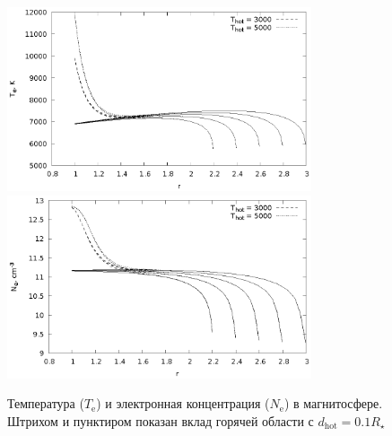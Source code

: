 \documentclass{article}
\begin{document}
\begin{figure}[!h]
\centering
\includegraphics[width=0.8\textwidth]{T_e.eps}
\includegraphics[width=0.8\textwidth]{N_e.eps}
\caption{Температура ($T_\text{e}$) и электронная концентрация ($N_\text{e}$) в магнитосфере. Штрихом и пунктиром показан вклад горячей области с $d_\text{hot} = 0.1 R_\star$}
\label{fig:TeNe}
\end{figure}
\end{document}
